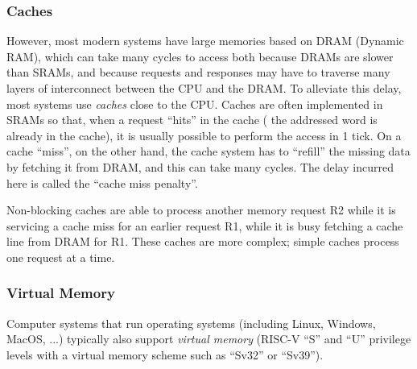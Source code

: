 
\subsubsection{Caches}



However, most modern systems have large memories based on DRAM
(Dynamic RAM), which can take many cycles to access both because DRAMs
are slower than SRAMs, and because requests and responses may have to
traverse many layers of interconnect between the CPU and the DRAM.  To
alleviate this delay, most systems use \emph{caches} close to the CPU.
Caches are often implemented in SRAMs so that, when a request ``hits''
in the cache ({\ie} the addressed word is already in the cache), it is
usually possible to perform the access in 1 tick.  On a cache
``miss'', on the other hand, the cache system has to ``refill'' the
missing data by fetching it from DRAM, and this can take many cycles.
The delay incurred here is called the ``cache miss penalty''.


Non-blocking caches are able to process another memory request R2
while it is servicing a cache miss for an earlier request R1, {\ie}
while it is busy fetching a cache line from DRAM for R1.  These caches
are more complex; simple caches process one request at a time.


\subsubsection{Virtual Memory}


Computer systems that run operating systems (including Linux, Windows,
MacOS, ...) typically also support \emph{virtual memory} (RISC-V ``S''
and ``U'' privilege levels with a virtual memory scheme such as
``Sv32'' or ``Sv39'').




